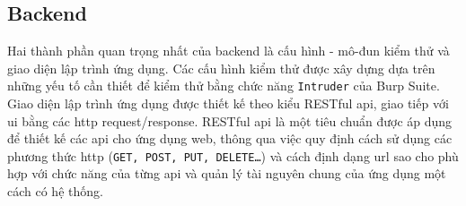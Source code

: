 \subsection{Backend}
Hai thành phần quan trọng nhất của backend là cấu hình - mô-đun kiểm thử và giao diện lập trình ứng dụng. Các cấu hình kiểm thử được xây dựng dựa trên những yếu tố cần thiết để kiểm thử bằng chức năng \texttt{Intruder} của Burp Suite. Giao diện lập trình ứng dụng được thiết kế theo kiểu RESTful \acrshort{api}, giao tiếp với \acrshort{ui} bằng các \acrshort{http} request/response. RESTful \acrshort{api} là một tiêu chuẩn được áp dụng để thiết kế các \acrshort{api} cho ứng dụng web, thông qua việc quy định cách sử dụng các phương thức \acrshort{http} (\texttt{GET, POST, PUT, DELETE…}) và cách định dạng \acrshort{url} sao cho phù hợp với chức năng của từng \acrshort{api} và quản lý tài nguyên chung của ứng dụng một cách có hệ thống.
